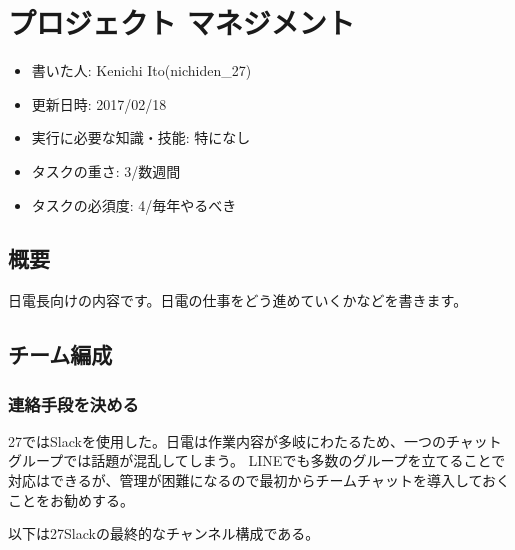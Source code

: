 \documentclass[letterpaper,10pt,dvipdfmx]{sphinxmanual}
\begin{document}
\chapter{プロジェクト マネジメント}
\label{\detokenize{management::doc}}\label{\detokenize{management:id1}}\begin{itemize}
\item {} 
書いた人: Kenichi Ito(nichiden\_27)

\item {} 
更新日時: 2017/02/18

\item {} 
実行に必要な知識・技能: 特になし

\item {} 
タスクの重さ: 3/数週間

\item {} 
タスクの必須度: 4/毎年やるべき

\end{itemize}


\section{概要}
\label{\detokenize{management:id2}}
日電長向けの内容です。日電の仕事をどう進めていくかなどを書きます。


\section{チーム編成}
\label{\detokenize{management:id3}}

\subsection{連絡手段を決める}
\label{\detokenize{management:id4}}
27ではSlackを使用した。日電は作業内容が多岐にわたるため、一つのチャットグループでは話題が混乱してしまう。
LINEでも多数のグループを立てることで対応はできるが、管理が困難になるので最初からチームチャットを導入しておくことをお勧めする。

以下は27Slackの最終的なチャンネル構成である。

\begin{sphinxVerbatim}[commandchars=\\\{\}]
\end{sphinxVerbatim}
\end{document}
